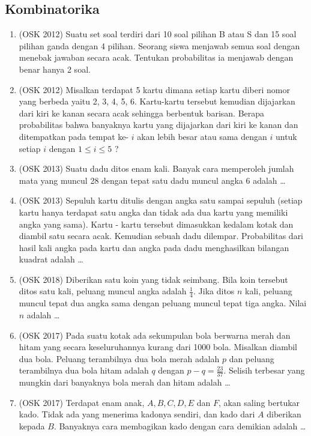    \subsection{Kombinatorika}
        \begin{enumerate}
            \item (OSK 2012) Suatu set soal terdiri dari 10 soal pilihan B atau S dan 15 soal pilihan ganda dengan 4 pilihan. Seorang siswa menjawab semua soal dengan menebak jawaban secara acak. Tentukan probabilitas ia menjawab dengan benar hanya 2 soal.
            
            \item (OSK 2012) Misalkan terdapat 5 kartu dimana setiap kartu diberi nomor yang berbeda yaitu 2, 3, 4, 5, 6. Kartu-kartu tersebut kemudian dijajarkan dari kiri ke kanan secara acak sehingga berbentuk barisan. Berapa probabilitas bahwa banyaknya kartu yang dijajarkan dari kiri ke kanan dan ditempatkan pada tempat ke- $i$ akan lebih besar atau sama dengan $i$ untuk setiap $i$ dengan $1 \le i \le 5$ ?
            
            \item (OSK 2013) Suatu dadu ditos enam kali. Banyak cara memperoleh jumlah mata yang muncul 28 dengan tepat satu dadu muncul angka 6 adalah \dots
            
            \item (OSK 2013) Sepuluh kartu ditulis dengan angka satu sampai sepuluh (setiap kartu hanya terdapat satu angka dan tidak ada dua kartu yang memiliki angka yang sama). Kartu - kartu tersebut dimasukkan kedalam kotak dan diambil satu secara acak. Kemudian sebuah dadu dilempar. Probabilitas dari hasil kali angka pada kartu dan angka pada dadu menghasilkan bilangan kuadrat adalah \dots
            
            \item (OSK 2018) Diberikan satu koin yang tidak seimbang. Bila koin tersebut ditos satu kali, peluang muncul angka adalah $\frac{1}{4}$. Jika ditos $n$ kali, peluang muncul tepat dua angka sama dengan peluang muncul tepat tiga angka. Nilai $n$ adalah \dots
            
            \item (OSK 2017) Pada suatu kotak ada sekumpulan bola berwarna merah dan hitam yang secara keseluruhannya kurang dari 1000 bola. Misalkan diambil dua bola. Peluang terambilnya dua bola merah adalah $p$ dan peluang terambilnya dua bola hitam adalah $q$ dengan $p-q =\frac{23}{37}$. Selisih terbesar yang mungkin dari banyaknya bola merah dan hitam adalah \dots
            
            \item (OSK 2017) Terdapat enam anak, $A, B, C, D, E$ dan $F$, akan saling bertukar kado. Tidak ada yang menerima kadonya sendiri, dan kado dari $A$ diberikan kepada $B$. Banyaknya cara membagikan kado dengan cara demikian adalah \dots
        \end{enumerate}
    
